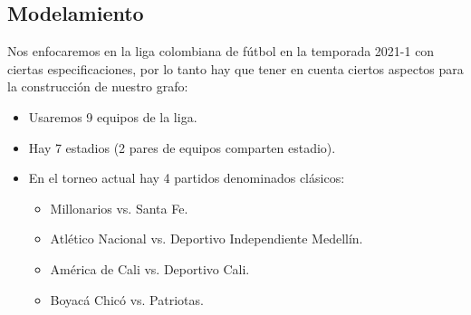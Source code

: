 \documentclass[11pt]{article}
\begin{document}
\begin{multicols}{2}
        \section{Modelamiento}
            Nos enfocaremos en la liga colombiana de fútbol en la temporada 2021-1 con ciertas especificaciones, por lo tanto hay que 
            tener en cuenta ciertos aspectos para la construcción de nuestro grafo:
            \begin{itemize}
                \item  Usaremos 9 equipos de la liga.
                \item  Hay 7 estadios (2 pares de equipos comparten estadio).
                \item  En el torneo actual hay 4 partidos denominados clásicos:
                \begin{itemize}
                    \item  Millonarios vs. Santa Fe.
                    \item  Atlético Nacional vs. Deportivo Independiente Medellín.
                    \item  América de Cali vs. Deportivo Cali.
                    \item  Boyacá Chicó vs. Patriotas.
                \end{itemize}
            \end{itemize}


\end{multicols}
\end{document}
